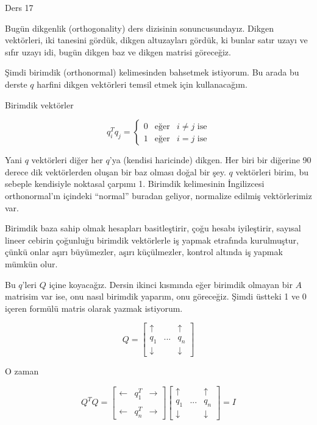 \documentclass[12pt,fleqn]{article}\usepackage{../../common}
\begin{document}
Ders 17

Bugün dikgenlik (orthogonality) ders dizisinin sonuncusundayız. Dikgen
vektörleri, iki tanesini gördük, dikgen altuzayları gördük, ki bunlar satır
uzayı ve sıfır uzayı idi, bugün dikgen baz ve dikgen matrisi göreceğiz.

Şimdi birimdik (orthonormal) kelimesinden bahsetmek istiyorum. Bu arada bu
derste $q$ harfini dikgen vektörleri temsil etmek için kullanacağım.

Birimdik vektörler 

$$
q_i^Tq_j = \left\{ \begin{array}{lll}
0 & \textrm{eğer} & i \ne j \textrm{ ise}\\
1 & \textrm{eğer} & i = j \textrm{ ise}
\end{array} \right.
$$

Yani $q$ vektörleri diğer her $q$'ya (kendisi haricinde) dikgen. Her biri
bir diğerine 90 derece dik vektörlerden oluşan bir baz olması doğal bir
şey. $q$ vektörleri birim, bu sebeple kendisiyle noktasal çarpımı
1. Birimdik kelimesinin İngilizcesi orthonormal'ın içindeki ``normal''
buradan geliyor, normalize edilmiş vektörlerimiz var.

Birimdik baza sahip olmak hesapları basitleştirir, çoğu hesabı iyileştirir,
sayısal lineer cebirin çoğunluğu birimdik vektörlerle iş yapmak etrafında
kurulmuştur, çünkü onlar aşırı büyümezler, aşırı küçülmezler, kontrol
altında iş yapmak mümkün olur.

Bu $q$'leri $Q$ içine koyacağız. Dersin ikinci kısmında eğer birimdik
olmayan bir $A$ matrisim var ise, onu nasıl birimdik yaparım, onu
göreceğiz. Şimdi üstteki 1 ve 0 içeren formülü matris olarak yazmak
istiyorum.

$$
Q = 
\left[\begin{array}{rrr}
\uparrow &  & \uparrow \\
q_1 & ... &  q_n \\
\downarrow &  & \downarrow 
\end{array}\right]
$$

O zaman 

$$
Q^TQ = 
\left[\begin{array}{rrr}
\leftarrow & q_1^T & \rightarrow \\
& &  \\
\leftarrow & q_n^T & \rightarrow 
\end{array}\right]
\left[\begin{array}{rrr}
\uparrow &  & \uparrow \\
q_1 & ... &  q_n \\
\downarrow &  & \downarrow 
\end{array}\right] = 
I
$$
\end{document}
